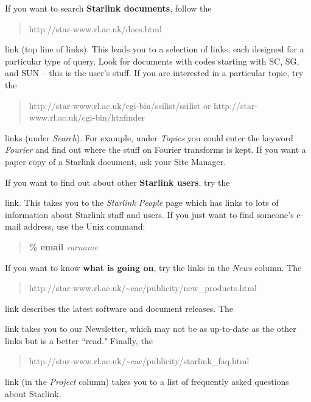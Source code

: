 If you want to search {\bf Starlink documents}, follow the
\begin{quote}
{http://star-www.rl.ac.uk/docs.html}
\end{quote}
link (top line of links).
This leads you to a selection of links, each designed for a particular type of
query.
Look for documents with codes starting with SC, SG, and SUN -- this is the
user's stuff.
If you are interested in a particular topic, try the
\begin{quote}
{http://star-www.rl.ac.uk/cgi-bin/ssilist/ssilist} {\rm or}
{http://star-www.rl.ac.uk/cgi-bin/htxfinder}
\end{quote}
links (under {\em Search}).
For example, under {\em Topics}\/ you could enter the keyword
{\em Fourier}\/ and find out where the stuff on Fourier transforms is kept.
If you want a paper copy of a Starlink document, ask your Site Manager.

If you want to find out about other {\bf Starlink users}, try the
\begin{quote}
\end{quote}
link.
This takes you to the {\em Starlink People}\/ page which has links to lots of
information about Starlink staff and users.
If you just want to find someone's e-mail address, use the Unix command:
\begin{quote}
{\bf \% email} {\it surname}
\end{quote}
If you want to know {\bf what is going on}, try the links in the {\em News}\/
column.
The
\begin{quote}
{http://star-www.rl.ac.uk/\~{}cac/publicity/new_products.html}
\end{quote}
link describes the latest software and document releases.
The
\begin{quote}
\end{quote}
link takes you to our Newsletter, which may not be as up-to-date as the other
links but is a better ``read."
Finally, the
\begin{quote}
{http://star-www.rl.ac.uk/\~{}cac/publicity/starlink_faq.html}
\end{quote}
link (in the {\em Project}\/ column) takes you to a list of frequently asked
questions about Starlink.

